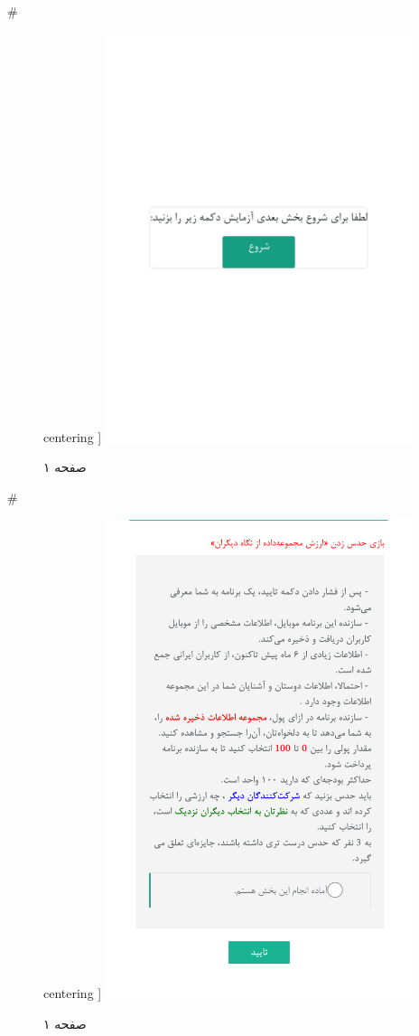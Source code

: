 { 
 # 
\begin{figure}[htpb]
centering ]
\includegraphics[width=0.8\textwidth]{./img/Task56.png/}
\caption{صفحه ۱}
\label{fig:Task1}
\end{figure}
 
 
 # 
\begin{figure}[htpb]
centering ]
\includegraphics[width=0.8\textwidth]{./img/Task57.png/}
\caption{صفحه ۱}
\label{fig:Task1}
\end{figure}
 
}
